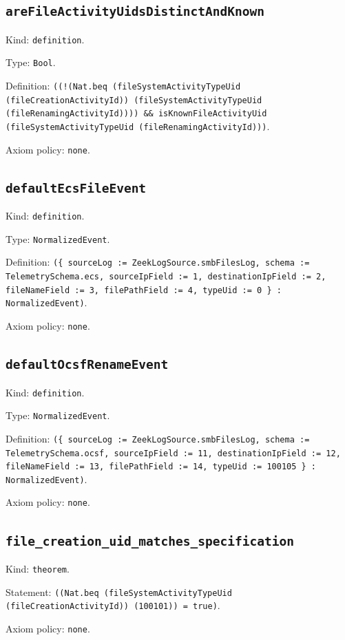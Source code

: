 \documentclass[11pt]{article}
\begin{document}
\subsection*{\texttt{areFileActivityUidsDistinctAndKnown}}
\noindent Kind: \texttt{definition}.\par
\noindent Type: \texttt{Bool}.\par
\noindent Definition: \texttt{((!(Nat.beq (fileSystemActivityTypeUid (fileCreationActivityId)) (fileSystemActivityTypeUid (fileRenamingActivityId)))) \&\& isKnownFileActivityUid (fileSystemActivityTypeUid (fileRenamingActivityId)))}.\par
\noindent Axiom policy: \texttt{none}.\par
\subsection*{\texttt{defaultEcsFileEvent}}
\noindent Kind: \texttt{definition}.\par
\noindent Type: \texttt{NormalizedEvent}.\par
\noindent Definition: \texttt{(\{ sourceLog := ZeekLogSource.smbFilesLog, schema := TelemetrySchema.ecs, sourceIpField := 1, destinationIpField := 2, fileNameField := 3, filePathField := 4, typeUid := 0 \} : NormalizedEvent)}.\par
\noindent Axiom policy: \texttt{none}.\par
\subsection*{\texttt{defaultOcsfRenameEvent}}
\noindent Kind: \texttt{definition}.\par
\noindent Type: \texttt{NormalizedEvent}.\par
\noindent Definition: \texttt{(\{ sourceLog := ZeekLogSource.smbFilesLog, schema := TelemetrySchema.ocsf, sourceIpField := 11, destinationIpField := 12, fileNameField := 13, filePathField := 14, typeUid := 100105 \} : NormalizedEvent)}.\par
\noindent Axiom policy: \texttt{none}.\par
\subsection*{\texttt{file\_creation\_uid\_matches\_specification}}
\noindent Kind: \texttt{theorem}.\par
\noindent Statement: \texttt{((Nat.beq (fileSystemActivityTypeUid (fileCreationActivityId)) (100101)) = true)}.\par
\noindent Axiom policy: \texttt{none}.\par
\end{document}
